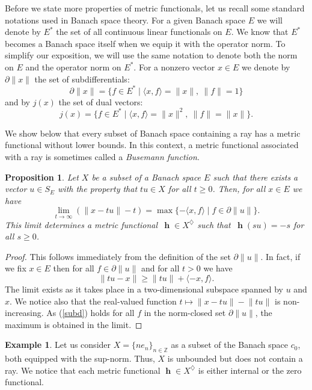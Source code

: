 \documentclass[a4paper,12pt]{article}
\newtheorem{proposition}[theorem]{Proposition}
\theoremstyle{definition}
\newtheorem{example}[theorem]{Example}
\numberwithin{equation}{section}
\newcommand{\norm}[1]{\lVert#1\rVert} %
\newcommand{\dpair}[2]{\langle#1, #2\rangle} %
\numberwithin{equation}{section}
\DeclareMathOperator{\h}{\mathbf{h}} %
\begin{document}
Before we state more properties of metric 
functionals, let us recall some standard 
notations used in Banach space theory.
For a given Banach space $E$ we will denote 
by $E^*$ the set of all continuous linear 
functionals on $E$. We know that $E^*$
becomes a Banach space itself when we equip it
with the operator norm. To simplify our 
exposition, we will use the same notation to
denote both the norm on $E$ and the operator 
norm on $E^*$. For a nonzero vector 
$x \in E$ we denote by $\partial \norm{x}$ 
the set of subdifferentials:
$$
    \partial \norm{x} = \{ f \in E^* 
    \mid \dpair{x}{f} 
    = \norm{x},\ \norm{f} = 1 \}
$$ 
and by $j(x)$ the set of dual vectors:
$$
    j(x) = \{ f \in E^* \mid \dpair{x}{f} 
        = \norm{x}^2,\ \norm{f} 
        = \norm{x} \}.
$$

We show below that every subset of Banach 
space containing a ray has a metric 
functional without lower bounds. In this 
context, a metric functional associated with 
a ray is sometimes called a 
\emph{Busemann function}.

\begin{proposition}\label{prop:Busemann} 
Let $X$ be a subset of a Banach space $E$ 
such that there exists a vector $u\in S_E$ 
with the property that $tu\in X$ for all 
$t \geq 0$. Then, for all $x\in E$ we have
$$
\lim_{t\to \infty} (\norm{x- tu} - t) 
    = \max \{ -\dpair{x}{f} \mid f \in 
    \partial \norm{u} \}.
$$
This limit determines a metric functional 
$\,\h\in X^\diamondsuit$ such that 
$\,\h(su) = -s$ for all $s\geq 0$.
\end{proposition}

\begin{proof}  
 
This follows immediately from the definition 
of the set $\partial \norm{u}$.  In fact, if
we fix $x\in E$ then for all 
$f\in \partial \norm{u}$ and for all $t>0$
we have
\begin{equation}\label{subd}
\norm{t u - x} \ge \norm{t u} + \dpair{-x}{f}.
\end{equation} 
The limit exists as it takes place in a 
two-dimensional subspace spanned by $u$ and 
$x$. We notice also that the real-valued 
function $t\mapsto \norm{x - tu} - \norm{t u}$ 
is non-increasing. As (\ref{subd}) holds for 
all $f$ in the norm-closed set 
$\partial\norm{u}$, the maximum is obtained 
in the limit. 
\end{proof}

\begin{example}  
Let us consider 
$X=\{n e_n\}_{n\in \mathbb Z}$ as a subset of 
the Banach space $c_0$, both equipped with the
sup-norm. Thus, $X$ is unbounded but does not 
contain a ray. We notice that each metric 
functional $\h \in X^\diamondsuit$ is either 
internal or the zero functional.
\end{example}
\end{document}
